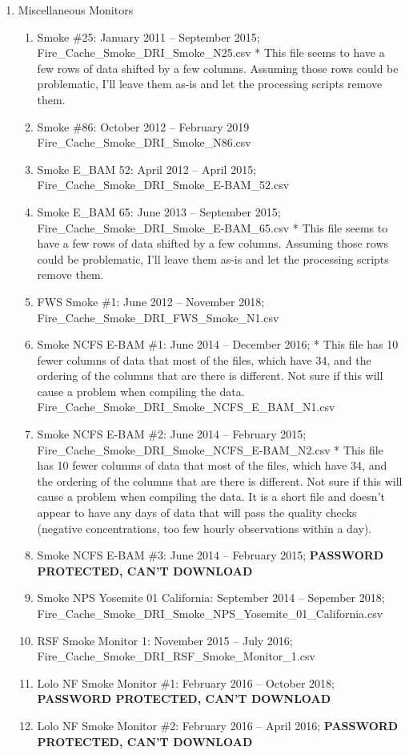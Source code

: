 \begin{enumerate}
\item Miscellaneous Monitors
\begin{enumerate}[nolistsep]
\item Smoke \#25: January 2011 -- September 2015; Fire\_Cache\_Smoke\_DRI\_Smoke\_N25.csv * This file seems to have a few rows of data shifted by a few columns. Assuming those rows could be problematic, I'll leave them as-is and let the processing scripts remove them.
\item Smoke \#86: October 2012 -- February 2019 Fire\_Cache\_Smoke\_DRI\_Smoke\_N86.csv
\item Smoke E\_BAM 52: April 2012 -- April 2015; Fire\_Cache\_Smoke\_DRI\_Smoke\_E-BAM\_52.csv
\item Smoke E\_BAM 65: June 2013 -- September 2015; Fire\_Cache\_Smoke\_DRI\_Smoke\_E-BAM\_65.csv * This file seems to have a few rows of data shifted by a few columns. Assuming those rows could be problematic, I'll leave them as-is and let the processing scripts remove them.
\item FWS Smoke \#1: June 2012 -- November 2018; Fire\_Cache\_Smoke\_DRI\_FWS\_Smoke\_N1.csv
\item Smoke NCFS E-BAM \#1: June 2014 -- December 2016; * This file has 10 fewer columns of data that most of the files, which have 34, and the ordering of the columns that are there is different. Not sure if this will cause a problem when compiling the data. Fire\_Cache\_Smoke\_DRI\_Smoke\_NCFS\_E\_BAM\_N1.csv
\item Smoke NCFS E-BAM \#2: June 2014 -- February 2015; Fire\_Cache\_Smoke\_DRI\_Smoke\_NCFS\_E-BAM\_N2.csv * This file has 10 fewer columns of data that most of the files, which have 34, and the ordering of the columns that are there is different. Not sure if this will cause a problem when compiling the data. It is a short file and doesn't appear to have any days of data that will pass the quality checks (negative concentrations, too few hourly observations within a day).
\item Smoke NCFS E-BAM \#3: June 2014 -- February 2015; \textbf{PASSWORD PROTECTED, CAN'T DOWNLOAD}
\item Smoke NPS Yosemite 01 California: September 2014 -- Sepember 2018; Fire\_Cache\_Smoke\_DRI\_Smoke\_NPS\_Yosemite\_01\_California.csv
\item RSF Smoke Monitor 1: November 2015 -- July 2016; Fire\_Cache\_Smoke\_DRI\_RSF\_Smoke\_Monitor\_1.csv
\item Lolo NF Smoke Monitor \#1: February 2016 -- October 2018;  \textbf{PASSWORD PROTECTED, CAN'T DOWNLOAD}
\item Lolo NF Smoke Monitor \#2: February 2016 -- April 2016;  \textbf{PASSWORD PROTECTED, CAN'T DOWNLOAD}

\end{enumerate}

\end{enumerate}
